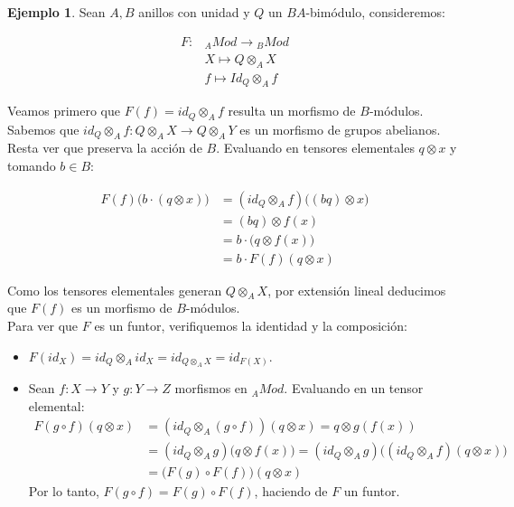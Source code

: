 \documentclass{article}
\theoremstyle{plain}
\theoremstyle{definition}
\newtheorem{ejemplo}[theorem]{Ejemplo}
\theoremstyle{remark}
\begin{document}
\begin{ejemplo}
    Sean $A,B$ anillos con unidad y $Q$ un $BA$-bimódulo, consideremos:

    \begin{align*}
        F: & {}_A Mod \longrightarrow {}_B Mod \\
        & X \longmapsto Q \otimes_A X \\
        & f \longmapsto Id_Q \otimes_A f  
    \end{align*}

    Veamos primero que $F(f) = id_Q \otimes_A f$ resulta un morfismo de $B$-módulos.  \\

        Sabemos que $id_Q \otimes_A f: Q \otimes_A X \to Q \otimes_A Y$ es un morfismo de grupos abelianos. Resta ver que preserva la acción de $B$. Evaluando en tensores elementales $q \otimes x$ y tomando $b \in B$:

        \begin{align*}
            F(f)\big(b \cdot (q \otimes x)\big) &= (id_Q \otimes_A f) \big( (bq) \otimes x \big) \\
            &= (bq) \otimes f(x) \\
            &= b \cdot \big( q \otimes f(x) \big) \\
            &= b \cdot F(f)(q \otimes x)
        \end{align*}

        Como los tensores elementales generan $Q \otimes_A X$, por extensión lineal deducimos que $F(f)$ es un morfismo de $B$-módulos. \\

        Para ver que $F$ es un funtor, verifiquemos la identidad y la composición:
        \begin{itemize}
            \item $F(id_X) = id_Q \otimes_A id_X = id_{Q \otimes_A X} = id_{F(X)}$.
            \item Sean $f: X \to Y$ y $g: Y \to Z$ morfismos en ${}_A Mod$. Evaluando en un tensor elemental:
            \begin{align*}
                F(g \circ f)(q \otimes x) &= (id_Q \otimes_A (g \circ f))(q \otimes x) = q \otimes g(f(x)) \\
                &= (id_Q \otimes_A g)\big( q \otimes f(x) \big) = (id_Q \otimes_A g) \Big( (id_Q \otimes_A f)(q \otimes x) \Big) \\
                &= \big( F(g) \circ F(f) \big)(q \otimes x)
            \end{align*}
            Por lo tanto, $F(g \circ f) = F(g) \circ F(f)$, haciendo de $F$ un funtor.
        \end{itemize}


\end{ejemplo}
\end{document}
